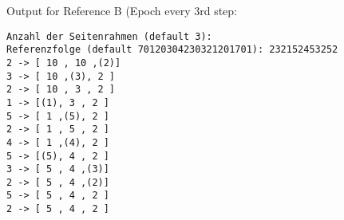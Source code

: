 \documentclass{article}
\begin{document}
Output for Reference B (Epoch every 3rd step:
\begin{lstlisting}
Anzahl der Seitenrahmen (default 3): 
Referenzfolge (default 70120304230321201701): 232152453252
2 -> [ 10 , 10 ,(2)]
3 -> [ 10 ,(3), 2 ]
2 -> [ 10 , 3 , 2 ]
1 -> [(1), 3 , 2 ]
5 -> [ 1 ,(5), 2 ]
2 -> [ 1 , 5 , 2 ]
4 -> [ 1 ,(4), 2 ]
5 -> [(5), 4 , 2 ]
3 -> [ 5 , 4 ,(3)]
2 -> [ 5 , 4 ,(2)]
5 -> [ 5 , 4 , 2 ]
2 -> [ 5 , 4 , 2 ]
\end{lstlisting}
\end{document}
